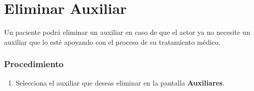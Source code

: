 \section{Eliminar Auxiliar}

Un paciente podrá eliminar un auxiliar en caso de que el actor ya
no necesite un auxiliar que lo esté apoyando con el proceso de su tratamiento médico.

\subsubsection{Procedimiento}
\begin{enumerate}
	
	\item Selecciona el auxiliar que deseas eliminar en la pantalla \textbf{Auxiliares}.
	

\end{enumerate}
